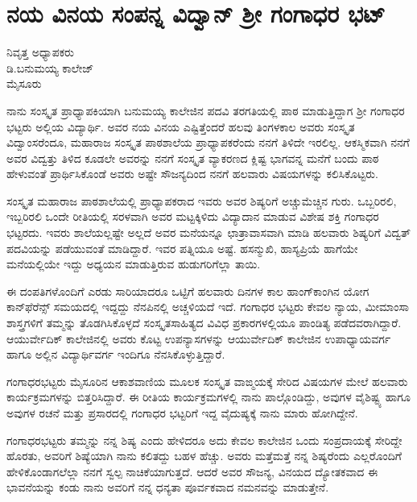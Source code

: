 \chapter{ನಯ ವಿನಯ ಸಂಪನ್ನ  ವಿದ್ವಾನ್ ಶ್ರೀ ಗಂಗಾಧರ ಭಟ್}

\begin{center}
\smallskip

ನಿವೃತ್ತ ಅಧ್ಯಾಪಕರು\\
ಡಿ.ಬನುಮಯ್ಯ ಕಾಲೇಜ್\\
ಮೈಸೂರು
\addrule
\end{center}

ನಾನು ಸಂಸ್ಕೃತ ಪ್ರಾಧ್ಯಾಪಕಿಯಾಗಿ ಬನುಮಯ್ಯ ಕಾಲೇಜಿನ ಪದವಿ ತರಗತಿಯಲ್ಲಿ ಪಾಠ ಮಾಡುತ್ತಿದ್ದಾಗ ಶ್ರೀ ಗಂಗಾಧರ ಭಟ್ಟರು ಅಲ್ಲಿಯ ವಿದ್ಯಾರ್ಥಿ. ಅವರ ನಯ ವಿನಯ ಎಷ್ಟಿತ್ತೆಂದರೆ ಹಲವು ತಿಂಗಳಕಾಲ ಅವರು ಸಂಸ್ಕೃತ ವಿದ್ವಾಂಸರೆಂದೂ, ಮಹಾರಾಜ ಸಂಸ್ಕೃತ ಪಾಠಶಾಲೆಯ ಪ್ರಾಧ್ಯಾಪಕರೆಂದು ನನಗೆ ತಿಳಿದೇ ಇರಲಿಲ್ಲ. ಆಕಸ್ಮಿಕವಾಗಿ ನನಗೆ ಅವರ ವಿದ್ವತ್ತು ತಿಳಿದ ಕೂಡಲೇ ಅವರನ್ನು ನನಗೆ ಸಂಸ್ಕೃತ ವ್ಯಾಕರಣದ ಕ್ಲಿಷ್ಟ ಭಾಗವನ್ನ ಮನೆಗೆ ಬಂದು ಪಾಠ ಹೇಳುವಂತೆ ಪ್ರಾರ್ಥಿಸಿಕೊಂಡೆ ಅವರು ಅಷ್ಟೇ ಸೌಜನ್ಯದಿಂದ ನನಗೆ ಹಲವಾರು ವಿಷಯಗಳನ್ನು ಕಲಿಸಿಕೊಟ್ಟರು.

ಸಂಸ್ಕೃತ ಮಹಾರಾಜ ಪಾಠಶಾಲೆಯಲ್ಲಿ ಪ್ರಾಧ್ಯಾಪಕರಾದ ಇವರು ಅವರ ಶಿಷ್ಯರಿಗೆ ಅಚ್ಚುಮೆಚ್ಚಿನ ಗುರು. ಒಬ್ಬರಿರಲಿ, ಇಬ್ಬರಿರಲಿ ಒಂದೇ ರೀತಿಯಲ್ಲಿ ಸರಳವಾಗಿ ಅವರ ಮಟ್ಟಕ್ಕಿಳಿದು ವಿದ್ಯಾದಾನ ಮಾಡುವ ವಿಶೇಷ ಶಕ್ತಿ ಗಂಗಾಧರ ಭಟ್ಟರದು. ಇವರು ಶಾಲೆಯಲ್ಲಷ್ಟೇ ಅಲ್ಲದೆ ಅವರ ಮನೆಯನ್ನೂ ಛಾತ್ರಾವಾಸವಾಗಿ ಮಾಡಿ ಹಲವಾರು ಶಿಷ್ಯರಿಗೆ ವಿದ್ವತ್ ಪದವಿಯನ್ನು ಪಡೆಯುವಂತೆ ಮಾಡಿದ್ದಾರೆ. ಇವರ ಪತ್ನಿಯೂ ಅಷ್ಟೆ. ಹಸನ್ಮುಖಿ, ಹಾಸ್ಯಪ್ರಿಯೆ ಹಾಗೆಯೇ ಮನೆಯಲ್ಲಿಯೇ ಇದ್ದು ಅಧ್ಯಯನ ಮಾಡುತ್ತಿರುವ ಹುಡುಗರಿಗೆಲ್ಲಾ ತಾಯಿ.

ಈ ದಂಪತಿಗಳೊಂದಿಗೆ ಎರಡು ಸಾರಿಯಾದರೂ ಒಟ್ಟಿಗೆ ಹಲವಾರು ದಿನಗಳ ಕಾಲ ಹಾಂಗ್‍ಕಾಂಗಿನ ಯೋಗ ಕಾನ್‍ಫೆರೆನ್ಸ್ ಸಮಯದಲ್ಲಿ ಇದ್ದದ್ದು ನೆನಪಿನಲ್ಲಿ ಅಚ್ಚಳಿಯದೆ ಇದೆ. ಗಂಗಾಧರ ಭಟ್ಟರು ಕೇವಲ ನ್ಯಾಯ, ಮೀಮಾಂಸಾ ಶಾಸ್ತ್ರಗಳಿಗೆ ತಮ್ಮನ್ನು ತೊಡಗಿಸಿಕೊಳ್ಳದೆ ಸಂಸ್ಕೃತಸಾಹಿತ್ಯದ ವಿವಿಧ ಪ್ರಕಾರಗಳಲ್ಲಿಯೂ ಪಾಂಡಿತ್ಯ ಪಡೆದವರಾಗಿದ್ದಾರೆ. ಆಯುರ್ವೇದಿಕ್ ಕಾಲೇಜಿನಲ್ಲಿ ಅವರು ಕೊಟ್ಟ ಉಪನ್ಯಾಸಗಳನ್ನು ಆಯುರ್ವೇದಿಕ್ ಕಾಲೇಜಿನ ಉಪಾಧ್ಯಾಯವರ್ಗ ಹಾಗೂ ಅಲ್ಲಿನ ವಿದ್ಯಾರ್ಥಿವರ್ಗ ಇಂದಿಗೂ ನೆನಸಿಕೊಳ್ಳುತ್ತಿದ್ದಾರೆ.

ಗಂಗಾಧರಭಟ್ಟರು ಮೈಸೂರಿನ ಆಕಾಶವಾಣಿಯ ಮೂಲಕ ಸಂಸ್ಕೃತ ವಾಙ್ಮಯಕ್ಕೆ ಸೇರಿದ ವಿಷಯಗಳ ಮೇಲೆ ಹಲವಾರು ಕಾರ್ಯಕ್ರಮಗಳನ್ನು ಬಿತ್ತರಿಸಿದ್ದಾರೆ. ಈ ರೀತಿಯ ಕಾರ್ಯಕ್ರಮಗಳಲ್ಲಿ ನಾನು ಪಾಲ್ಗೊಂಡಿದ್ದು, ಅವುಗಳ ವೈಶಿಷ್ಟ್ಯ ಹಾಗೂ ಅವುಗಳ ರಚನೆ ಮತ್ತು ಪ್ರಸಾರದಲ್ಲಿ ಗಂಗಾಧರ ಭಟ್ಟರಿಗೆ ಇದ್ದ ವೈದುಷ್ಯಕ್ಕೆ ನಾನು ಮಾರು ಹೋಗಿದ್ದೇನೆ.

ಗಂಗಾಧರಭಟ್ಟರು ತಮ್ಮನ್ನು ನನ್ನ ಶಿಷ್ಯ ಎಂದು ಹೇಳಿದರೂ ಅದು ಕೇವಲ ಕಾಲೇಜಿನ ಒಂದು ಸಂಪ್ರದಾಯಕ್ಕೆ ಸೇರಿದ್ದೇ ಹೊರತು, ಅವರಿಗೆ ಶಿಷ್ಯೆಯಾಗಿ ನಾನು ಕಲಿತದ್ದು ಬಹಳ ಹೆಚ್ಚು. ಅವರು ಮತ್ತೆಮತ್ತೆ ನನ್ನ ಶಿಷ್ಯರೆಂದು ಎಲ್ಲರೊಂದಿಗೆ ಹೇಳಿಕೊಂಡಾಗಲೆಲ್ಲಾ ನನಗೆ ಸ್ವಲ್ಪ ನಾಚಿಕೆಯಾಗುತ್ತದೆ. ಆದರೆ ಅವರ ಸೌಜನ್ಯ, ವಿನಯದ ದ್ಯೋತಕವಾದ ಈ ಭಾವನೆಯನ್ನು ಕಂಡು ನಾನು ಅವರಿಗೆ ನನ್ನ ಧನ್ಯತಾ ಪೂರ್ವಕವಾದ ನಮನವನ್ನು ಮಾಡುತ್ತೇನೆ.

